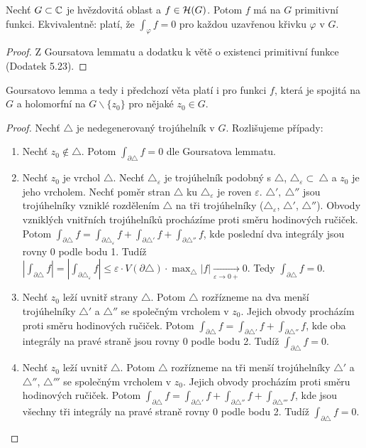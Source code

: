 \newpage
\begin{theorem}\label{thm:CaVpHvezdicObl}
Nechť $G \subset \operatorname{\mathbb{C}}  $ je hvězdovitá oblast a  $f \in \operatorname{\mathcal{H}} (G)$. Potom $f$ má na $G$ primitivní funkci. Ekvivalentně: platí, že $\int_\varphi f=0$ pro každou uzavřenou křivku $\varphi$ v $G$.
\end{theorem}

\begin{proof}
Z Goursatova lemmatu a dodatku k větě o existenci primitivní funkce (Dodatek 5.23).
\end{proof}

\begin{note} %
Goursatovo lemma a tedy i předchozí věta platí i pro funkci $f$, která je spojitá na $G$ a holomorfní na $G \backslash \{z_0\}$ pro nějaké $z_0 \in G$.
\end{note}

\begin{proof}
Nechť $\triangle$ je nedegenerovaný trojúhelník v $G$. Rozlišujeme případy:
\begin{enumerate}
    \item Nechť $z_0 \notin \triangle$. Potom $\int_{\partial\triangle}f=0$ dle Goursatova lemmatu.
    \item Nechť $z_0$ je vrchol $\triangle$. Nechť $\triangle_\varepsilon$ je trojúhelník podobný s $\triangle$, $\triangle_\varepsilon\subset\ \triangle$
    a
    $z_{0}$ je jeho
    vrcholem. Nechť poměr stran $\triangle$ ku 
    $\triangle_\varepsilon$ je
    roven $\varepsilon$. $\triangle',\ \triangle''$ jsou trojúhelníky vzniklé rozdělením $\triangle$ na tři trojúhelníky ($\triangle_\varepsilon$, $\triangle'$, $\triangle''$). Obvody vzniklých vnitřních trojúhelníků procházíme proti směru hodinových ručiček.
    Potom $\int_{\partial\triangle}f=\int_{\partial\triangle_\varepsilon}f+\int_{\partial\triangle'}f+\int_{\partial\triangle''}f$, kde poslední dva integrály jsou rovny $0$ podle bodu 1. Tudíž $|\int_{\partial\triangle}f|=|\int_{\partial\triangle_\varepsilon}f| \le \varepsilon \cdot V(\partial\triangle) \cdot \max_\triangle |f| \xrightarrow[\varepsilon \rightarrow 0+]{}0$. Tedy  $\int_{\partial\triangle} f=0$.
    \item Nechť $z_0$ leží uvnitř strany $\triangle$. Potom $\triangle$ rozřízneme na dva menší trojúhelníky $\triangle'$ a $\triangle''$ se společným vrcholem v $z_{0}$. Jejich obvody procházím proti směru hodinových ručiček. Potom $\int_{\partial\triangle}f=\int_{\partial\triangle'}f+\int_{\partial\triangle''}f$, kde oba integrály na pravé straně jsou rovny $0$ podle bodu 2. Tudíž $\int_{\partial\triangle}f=0$.
    \item Nechť $z_0$ leží uvnitř $\triangle$. Potom $\triangle$ rozřízneme na tři menší trojúhelníky $\triangle'$ a $\triangle''$, $\triangle'''$ se společným vrcholem v $z_{0}$. Jejich obvody procházím proti směru hodinových ručiček. Potom $\int_{\partial\triangle}f=\int_{\partial\triangle'}f+\int_{\partial\triangle''}f+\int_{\partial\triangle'''}f$, kde jsou všechny tři integrály na pravé straně rovny $0$ podle bodu 2. Tudíž $\int_{\partial\triangle}f=0$.
\end{enumerate}
\end{proof}

